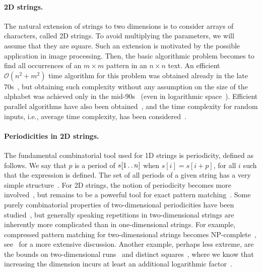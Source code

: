 \documentclass[11pt, letterpaper]{article}
\theoremstyle{plain}
\theoremstyle{definition}
\theoremstyle{remark}
\def\dd{\mathinner{.\,.}}
\renewcommand{\O}{\mathcal{O}}
\begin{document}
\paragraph{2D strings.} The natural extension of strings to two dimensions is to consider arrays
of characters, called 2D strings. To avoid multiplying the parameters, we will assume that they are square. Such an extension
is motivated by the possible application in image processing. Then, the basic algorithmic problem becomes
to find all occurrences of an $m\times m$ pattern in an $n\times n$ text. An efficient $\O(n^{2}+m^{2})$ time algorithm
for this problem was obtained already in the late 70s~\cite{Bird1977}, but obtaining such complexity without
any assumption on the size of the alphabet was achieved only in the mid-90s~\cite{Amir1994,Galil1996}
(even in logarithmic space~\cite{Crochemore1995}). Efficient parallel algorithms have also been obtained~\cite{Crochemore1998,Crochemore1998},
and the time complexity for random inputs, i.e., average time complexity, has been considered~\cite{Baeza-Yates1993,Tarhio1996,Kaerkkaeinen1999}.

\paragraph{Periodicities in 2D strings.} The fundamental combinatorial tool used for 1D strings is periodicity,
defined as follows. We say that $p$ is a period of $s[1 \dd n]$ when $s[i]=s[i+p]$, for all $i$ such that the expression is defined.
The set of all periods of a given string has a very simple structure~\cite{Fine1965}. For 2D strings, the notion of periodicity
becomes more involved~\cite{Amir1998}, but remains to be a powerful tool for exact pattern matching~\cite{Amir1992,Galil1996}.
Some purely combinatorial properties of two-dimensional periodicities have been studied~\cite{Mignosi2003,Gamard2017},
but generally speaking repetitions in two-dimensional strings are inherently more complicated than in one-dimensional strings.
For example, compressed pattern matching for two-dimensional strings becomes NP-complete~\cite{Berman2002}, see~\cite{Rytter2000}
for a more extensive discussion.
Another example, perhaps less extreme, are the bounds on two-dimensional runs~\cite{Amir2020} and
distinct squares~\cite{Charalampopoulos2020}, where we know that increasing the dimension incurs at least an additional
logarithmic factor~\cite{Charalampopoulos2020}.
\end{document}
